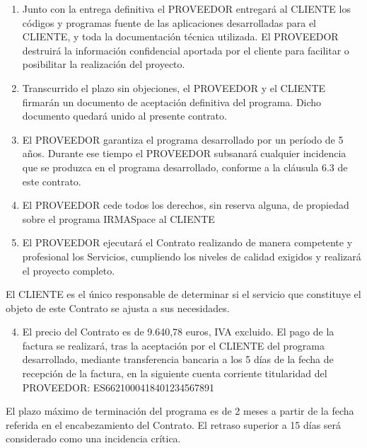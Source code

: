 \begin{description}[style=nextline]
\begin{enumerate}
\begin{enumerate}
  \item Junto con la entrega definitiva el PROVEEDOR  entregará al CLIENTE los códigos y programas fuente de las aplicaciones desarrolladas para el CLIENTE, y toda la documentación técnica utilizada. El PROVEEDOR destruirá la información confidencial aportada por el cliente para facilitar o posibilitar la realización del proyecto.
  \item Transcurrido el plazo sin objeciones, el PROVEEDOR y el CLIENTE firmarán un documento de aceptación definitiva del programa. Dicho documento quedará unido al presente contrato.
  \item El PROVEEDOR garantiza el programa desarrollado por un período de 5 años. Durante ese tiempo el PROVEEDOR subsanará cualquier incidencia que se produzca en el programa desarrollado, conforme a la cláusula 6.3 de este contrato.
  \item El PROVEEDOR cede todos los derechos, sin reserva alguna, de propiedad sobre el programa IRMASpace al CLIENTE
  \item  El PROVEEDOR ejecutará el Contrato realizando de manera competente y profesional los Servicios, cumpliendo los niveles de calidad exigidos y realizará el proyecto completo.
  \end{enumerate}
\end{enumerate}

\item[TERCERA.- POLÍTICA DE USO]
 \par El CLIENTE  es el único responsable de determinar si el servicio que constituye el objeto de este Contrato se ajusta a sus necesidades.

\item[CUARTA.- PRECIO Y FACTURACIÓN]

\begin{enumerate}
  \setcounter{enumi}{3}
  \item El precio del Contrato es de 9.640,78 euros, IVA excluido.
  El pago de la factura se realizará, tras la aceptación por el CLIENTE del programa desarrollado, mediante transferencia bancaria a los 5 días de la fecha de recepción de la factura, en la siguiente cuenta corriente titularidad del PROVEEDOR: ES6621000418401234567891
\end{enumerate}
\item[QUINTA.- DURACIÓN DEL CONTRATO]
\par El plazo máximo de terminación del programa es de 2 meses a partir de la fecha referida en el encabezamiento del Contrato.
El retraso superior a 15 días será considerado como una incidencia crítica.


\end{description}
